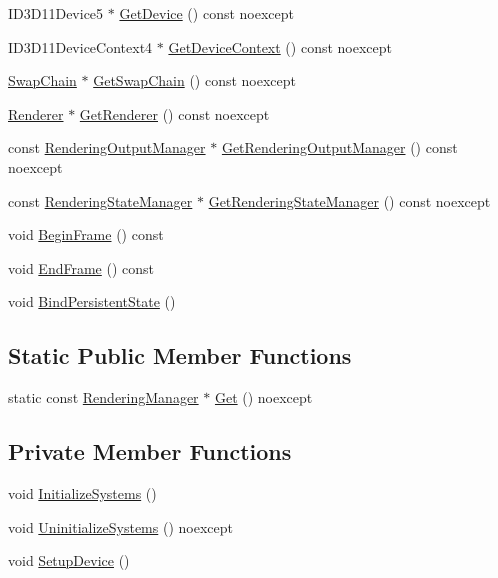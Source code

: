 \begin{DoxyCompactItemize}
I\+D3\+D11\+Device5 $\ast$ \hyperlink{classmage_1_1_rendering_manager_a92dc62ffd2e86652edd86739ff878ac2}{Get\+Device} () const noexcept
\item 
I\+D3\+D11\+Device\+Context4 $\ast$ \hyperlink{classmage_1_1_rendering_manager_a8067ea5d29a3f986dfdbd90ed1b956ee}{Get\+Device\+Context} () const noexcept
\item 
\hyperlink{classmage_1_1_swap_chain}{Swap\+Chain} $\ast$ \hyperlink{classmage_1_1_rendering_manager_a867d9d3986a38c98562cf0cfe9797fe0}{Get\+Swap\+Chain} () const noexcept
\item 
\hyperlink{classmage_1_1_renderer}{Renderer} $\ast$ \hyperlink{classmage_1_1_rendering_manager_a5b357f9f7e241945ac396cd09ba3be7e}{Get\+Renderer} () const noexcept
\item 
const \hyperlink{classmage_1_1_rendering_output_manager}{Rendering\+Output\+Manager} $\ast$ \hyperlink{classmage_1_1_rendering_manager_ad24d51b141e5579a3bd8fc63793977fe}{Get\+Rendering\+Output\+Manager} () const noexcept
\item 
const \hyperlink{classmage_1_1_rendering_state_manager}{Rendering\+State\+Manager} $\ast$ \hyperlink{classmage_1_1_rendering_manager_a762283c6474287a874f8e8667f69a165}{Get\+Rendering\+State\+Manager} () const noexcept
\item 
void \hyperlink{classmage_1_1_rendering_manager_ab1fe907a08658a8cf57217eb5a48728f}{Begin\+Frame} () const
\item 
void \hyperlink{classmage_1_1_rendering_manager_ab4aee54db3d5249e0cc0848383b80dab}{End\+Frame} () const
\item 
void \hyperlink{classmage_1_1_rendering_manager_adadab213b9aabdc6167a012d340084a6}{Bind\+Persistent\+State} ()
\end{DoxyCompactItemize}
\subsection*{Static Public Member Functions}
\begin{DoxyCompactItemize}
\item 
static const \hyperlink{classmage_1_1_rendering_manager}{Rendering\+Manager} $\ast$ \hyperlink{classmage_1_1_rendering_manager_a920fdd741d160b687ecac1d892f8bfd1}{Get} () noexcept
\end{DoxyCompactItemize}
\subsection*{Private Member Functions}
\begin{DoxyCompactItemize}
\item 
void \hyperlink{classmage_1_1_rendering_manager_a80812ecd5c9757b961e46e6bb7533566}{Initialize\+Systems} ()
\item 
void \hyperlink{classmage_1_1_rendering_manager_a3665d58d2a9e8995a348b5f2bd723d8b}{Uninitialize\+Systems} () noexcept
\item 
void \hyperlink{classmage_1_1_rendering_manager_a45d4cadcd572290f352027b5fa86b4f6}{Setup\+Device} ()
\end{DoxyCompactItemize}
